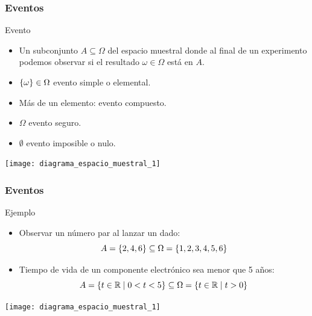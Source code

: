 \documentclass[table]{beamer}
\begin{document}
\begin{frame}
    \frametitle{Eventos}
    \begin{block}{Evento}
        \begin{itemize}
            \item Un subconjunto $A \subseteq \Omega$ del espacio muestral donde al final de un experimento podemos observar si el resultado $\omega \in \Omega$ está en $A$.
            \item $\bparens{\omega} \in \Omega$ evento simple o elemental.
            \item Más de un elemento: evento compuesto.
            \item $\Omega$ evento seguro.
            \item $\emptyset$ evento imposible o nulo.
        \end{itemize}
    \end{block}
    \begin{center}
        \texttt{[image: diagrama\_espacio\_muestral\_1]}
    \end{center}
\end{frame}

\begin{frame}
    \frametitle{Eventos}
    \begin{block}{Ejemplo}
        \begin{itemize}
            \item Observar un número par al lanzar un dado:
                \begin{equation*}
                    A = \bparens{2, 4, 6} \subseteq \Omega = \bparens{1, 2, 3, 4, 5, 6}
                \end{equation*}
            \item Tiempo de vida de un componente electrónico sea menor que 5 años:
                \begin{equation*}
                    A = \bparens{t \in \reals \mid 0 < t < 5} \subseteq \Omega = \bparens{t \in \reals \mid t > 0}
                \end{equation*}
        \end{itemize}
    \end{block}
    \begin{center}
        \texttt{[image: diagrama\_espacio\_muestral\_1]}
    \end{center}
\end{frame}



\end{document}
